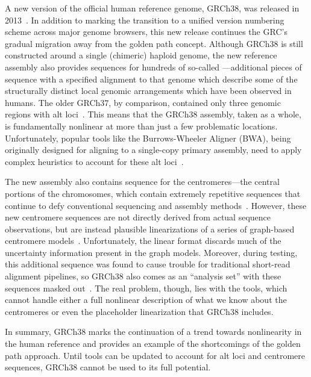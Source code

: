A new version of the official human reference genome, GRCh38, was released in 2013~\cite{grc2013announcing}. In addition to marking the transition to a unified version numbering scheme across major genome browsers, this new release continues the GRC's gradual migration away from the golden path concept. Although GRCh38 is still constructed around a single (chimeric) haploid genome, the new reference assembly also provides sequences for hundreds of so-called ---additional pieces of sequence with a specified alignment to that genome which describe some of the structurally distinct local genomic arrangements which have been observed in humans. The older GRCh37, by comparison, contained only three genomic regions with alt loci~\cite{church2011modernizing}. This means that the GRCh38 assembly, taken as a whole, is fundamentally nonlinear at more than just a few problematic locations. Unfortunately, popular tools like the Burrows-Wheeler Aligner (BWA), being originally designed for aligning to a single-copy primary assembly, need to apply complex heuristics to account for these alt loci~\cite{li2014bwa,li2014new}.

The new assembly also contains sequence for the centromeres---the central portions of the chromosomes, which contain extremely repetitive sequences that continue to defy conventional sequencing and assembly methods~\cite{karolchik2014new}. However, these new centromere sequences are not directly derived from actual sequence observations, but are instead plausible linearizations of a series of graph-based centromere models~\cite{miga2014centromere}. Unfortunately, the linear format discards much of the uncertainty information present in the graph models. Moreover, during testing, this additional sequence was found to cause trouble for traditional short-read alignment pipelines, so GRCh38 also comes as an ``analysis set'' with these sequences masked out~\cite{karolchik2014new}. The real problem, though, lies with the tools, which cannot handle either a full nonlinear description of what we know about the centromeres or even the placeholder linearization that GRCh38 includes.

In summary, GRCh38 marks the continuation of a trend towards nonlinearity in the human reference and provides an example of the shortcomings of the golden path approach. Until tools can be updated to account for alt loci and centromere sequences, GRCh38 cannot be used to its full potential.

